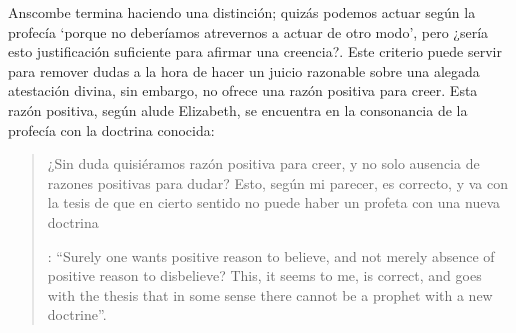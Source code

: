 Anscombe termina haciendo una distinción; quizás podemos actuar según la profecía \enquote*{porque no deberíamos atrevernos a actuar de otro modo}, pero ¿sería esto justificación suficiente para afirmar una creencia?. Este criterio puede servir para remover dudas a la hora de hacer un juicio razonable sobre una alegada atestación divina, sin embargo, no ofrece una razón positiva para creer. Esta razón positiva, según alude Elizabeth, se encuentra en la consonancia de la profecía con la doctrina conocida: \blockquote[{\Cite[39]{anscombe2008faith:prophandmi}}: \enquote{Surely one wants positive reason to believe, and not merely absence of positive reason to disbelieve? This, it seems to me, is correct, and goes with the thesis that in some sense there cannot be a prophet with a new doctrine}.]{¿Sin duda quisiéramos razón positiva para creer, y no solo ausencia de razones positivas para dudar? Esto, según mi parecer, es correcto, y va con la tesis de que en cierto sentido no puede haber un profeta con una nueva doctrina}.

